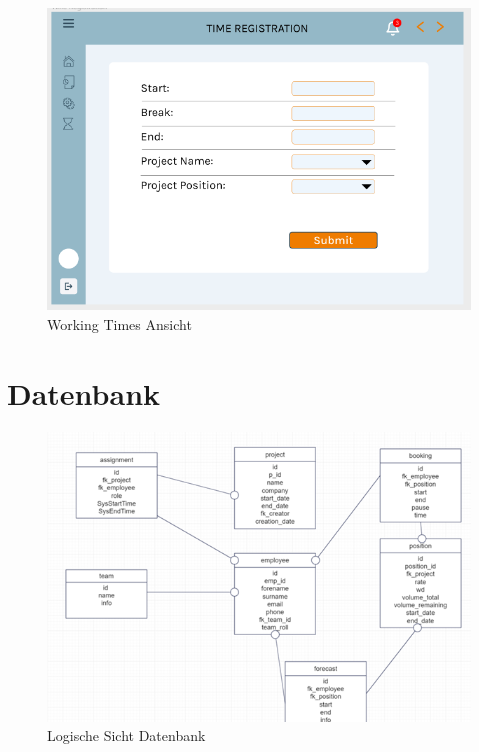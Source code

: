 \documentclass{article}
\begin{document}
        \begin{figure}[h]
            \includegraphics[height= 0.5\textwidth,width= \textwidth]{images/Time Registration.png}
            \caption{Working Times Ansicht}
            \label{fig:beispiel}
        \end{figure}
\newpage

\section{Datenbank}

    \begin{figure}[h]
        \centering
        \includegraphics[width= \textwidth]{images/logischeAnsicht.png}
        \caption{Logische Sicht Datenbank}
        \label{fig:beispiel}
    \end{figure}
\end{document}

